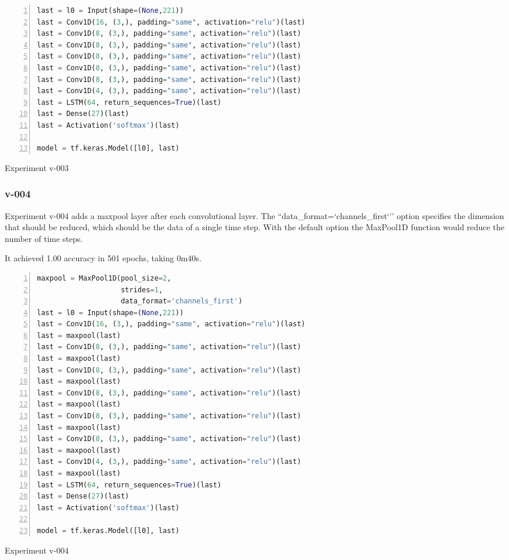 \noindent
\begin{algorithm}
\begin{lstlisting}[language=Python, frame=single, numbers=left]
last = l0 = Input(shape=(None,221))
last = Conv1D(16, (3,), padding="same", activation="relu")(last)
last = Conv1D(8, (3,), padding="same", activation="relu")(last)
last = Conv1D(8, (3,), padding="same", activation="relu")(last)
last = Conv1D(8, (3,), padding="same", activation="relu")(last)
last = Conv1D(8, (3,), padding="same", activation="relu")(last)
last = Conv1D(8, (3,), padding="same", activation="relu")(last)
last = Conv1D(4, (3,), padding="same", activation="relu")(last)
last = LSTM(64, return_sequences=True)(last)
last = Dense(27)(last)
last = Activation('softmax')(last)

model = tf.keras.Model([l0], last)
\end{lstlisting}
\caption{\label{alg:v003}Experiment v-003}
\end{algorithm}

\subsubsection{v-004}
Experiment v-004 adds a maxpool layer after each convolutional layer. The ``data\_format=`channels\_first`'' option specifies the dimension that should be reduced, which should be the data of a single time step. With the default option the MaxPool1D function would reduce the number of time steps.

It achieved 1.00 accuracy in 501 epochs, taking 0m40s.

\noindent
\begin{algorithm}
\begin{lstlisting}[language=Python, frame=single, numbers=left]
maxpool = MaxPool1D(pool_size=2,
                    strides=1,
                    data_format='channels_first')
last = l0 = Input(shape=(None,221))
last = Conv1D(16, (3,), padding="same", activation="relu")(last)
last = maxpool(last)
last = Conv1D(8, (3,), padding="same", activation="relu")(last)
last = maxpool(last)
last = Conv1D(8, (3,), padding="same", activation="relu")(last)
last = maxpool(last)
last = Conv1D(8, (3,), padding="same", activation="relu")(last)
last = maxpool(last)
last = Conv1D(8, (3,), padding="same", activation="relu")(last)
last = maxpool(last)
last = Conv1D(8, (3,), padding="same", activation="relu")(last)
last = maxpool(last)
last = Conv1D(4, (3,), padding="same", activation="relu")(last)
last = maxpool(last)
last = LSTM(64, return_sequences=True)(last)
last = Dense(27)(last)
last = Activation('softmax')(last)

model = tf.keras.Model([l0], last)
\end{lstlisting}
\caption{\label{alg:v004}Experiment v-004}
\end{algorithm}

